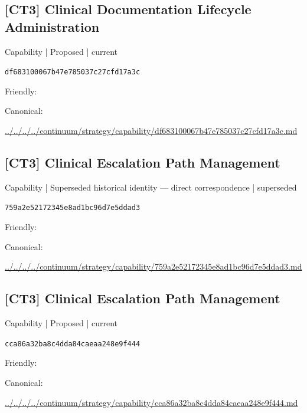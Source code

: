 \documentclass[10pt,a4paper]{article}
\begin{document}
\subsection*{[CT3] Clinical Documentation Lifecycle Administration}
{\small Capability | Proposed | current}\par
\texttt{df683100067b47e785037c27cfd17a3c}\par
Friendly: \par
Canonical: \par
{\footnotesize\url{../../../../continuum/strategy/capability/df683100067b47e785037c27cfd17a3c.md}}\par
\subsection*{[CT3] Clinical Escalation Path Management}
{\small Capability | Superseded historical identity — direct correspondence | superseded}\par
\texttt{759a2e52172345e8ad1bc96d7e5ddad3}\par
Friendly: \par
Canonical: \par
{\footnotesize\url{../../../../continuum/strategy/capability/759a2e52172345e8ad1bc96d7e5ddad3.md}}\par
\subsection*{[CT3] Clinical Escalation Path Management}
{\small Capability | Proposed | current}\par
\texttt{cca86a32ba8c4dda84caeaa248e9f444}\par
Friendly: \par
Canonical: \par
{\footnotesize\url{../../../../continuum/strategy/capability/cca86a32ba8c4dda84caeaa248e9f444.md}}\par
\end{document}
